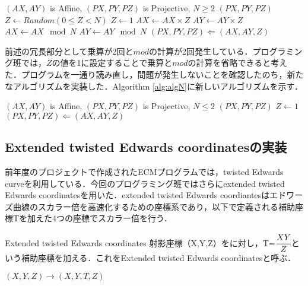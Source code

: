 \documentclass[openany,11pt,papersize]{jsbook}
\begin{document}
\begin{algorithm}[H]
\caption{Affine Coordinates to Projective Coordinates (Past ver.)}
\label{alg:algP}                          
\begin{algorithmic}                  
\REQUIRE $(AX,AY)$ is Affine, $(PX,PY,PZ)$ is Projective, $N \ge 2 $
\ENSURE $(PX,PY,PZ)$
\STATE $Z \leftarrow Random(0 \le Z < N)$
\STATE $Z \leftarrow 1$
\ENDIF
\STATE $AX \leftarrow AX \times Z$
\STATE $AY \leftarrow AY \times Z$
\STATE $AX \leftarrow AX \mod N$
\STATE $AY \leftarrow AY \mod N$
\STATE $(PX,PY,PZ) \Leftarrow (AX,AY,Z)$
\end{algorithmic}
\end{algorithm}


前述の冗長部分として乗算が2回と$mod$の計算が2回発生している．プログラミング班では，$Z$の値を1に設定することで乗算と$mod$の計算を省略できると考えた．プログラムを一通り読み直し，問題が発生しないことを確認したのち，新たなアルゴリズムを実装した．Algorithm \ref{alg:algN}に新しいアルゴリズムを示す．

\begin{algorithm}[H]                   
\caption{Affine Coordinates to Projective Coordinates (New ver.)}
\label{alg:algN}                          
\begin{algorithmic}                  
\REQUIRE $(AX,AY)$ is Affine, $(PX,PY,PZ)$ is Projective, $N \le 2 $
\ENSURE $(PX,PY,PZ)$
\STATE $Z \leftarrow 1$
\STATE $(PX,PY,PZ) \Leftarrow (AX,AY,Z)$
\end{algorithmic}
\end{algorithm}


\subsection{Extended twisted Edwards coordinatesの実装}\label{sec:alg2}
前年度のプロジェクトで作成されたECMプログラムでは，twisted Edwards curveを利用している．今回のプログラミング班ではさらにextended twisted Edwards coordinatesを用いた．extended twisted Edwards coordiantesはエドワーズ曲線のスカラー倍を高速化するための座標系であり，以下で定義される補助座標Tを加えた4つの座標でスカラー倍を行う．

\begin{itembox}[l]{Extended twisted Edwards coordinates}
射影座標（X,Y,Z）をに対し，T=$\cfrac{XY}{Z}$という補助座標を加える．これをExtended twisted Edwards coordinatesと呼ぶ．
\begin{center}
$(X,Y,Z) \rightarrow (X,Y,T,Z)$
\end{center}
\end{itembox}
\end{document}
